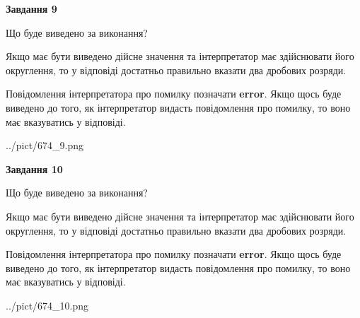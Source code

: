 \documentclass[12pt, ukrainian]{article}
\begin{document}
{\begin {Large}
{\begin {center}\textbf{Завдання 9}\end {center}}\par
Що буде виведено за виконання? \par

Якщо має бути виведено дійсне значення та інтерпретатор має здійснювати його округлення, 
то у відповіді достатньо правильно вказати два дробових розряди.

Повідомлення інтерпретатора про помилку позначати \textbf{error}.
Якщо щось буде виведено до того, як інтерпретатор видасть повідомлення про помилку, 
то воно має вказуватись у відповіді. \par

\begin{center}
	{../pict/674_9.png}
\end{center}
\newpage

{\begin {center}\textbf{Завдання 10}\end {center}}\par
Що буде виведено за виконання? \par

Якщо має бути виведено дійсне значення та інтерпретатор має здійснювати його округлення, 
то у відповіді достатньо правильно вказати два дробових розряди.

Повідомлення інтерпретатора про помилку позначати \textbf{error}.
Якщо щось буде виведено до того, як інтерпретатор видасть повідомлення про помилку, 
то воно має вказуватись у відповіді. \par

\begin{center}
	{../pict/674_10.png}
\end{center}
\newpage

\end {Large}}
\end{document}
